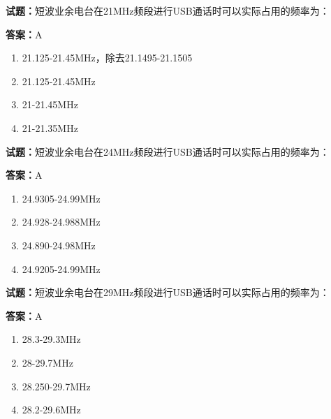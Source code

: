 \documentclass{ctexbook}
\begin{document}




\vspace{1em}

\textbf{试题：}短波业余电台在21MHz频段进行USB通话时可以实际占用的频率为： 

\textbf{答案：}A 

\begin{enumerate}[leftmargin=3em]
  \item 21.125-21.45MHz，除去21.1495-21.1505 

  \item 21.125-21.45MHz 

  \item 21-21.45MHz 

  \item 21-21.35MHz 

\end{enumerate}





\vspace{1em}

\textbf{试题：}短波业余电台在24MHz频段进行USB通话时可以实际占用的频率为： 

\textbf{答案：}A 

\begin{enumerate}[leftmargin=3em]
  \item 24.9305-24.99MHz 

  \item 24.928-24.988MHz 

  \item 24.890-24.98MHz 

  \item 24.9205-24.99MHz 

\end{enumerate}





\vspace{1em}

\textbf{试题：}短波业余电台在29MHz频段进行USB通话时可以实际占用的频率为： 

\textbf{答案：}A 

\begin{enumerate}[leftmargin=3em]
  \item 28.3-29.3MHz 

  \item 28-29.7MHz 

  \item 28.250-29.7MHz 


  \item 28.2-29.6MHz 

\end{enumerate}
\end{document}
